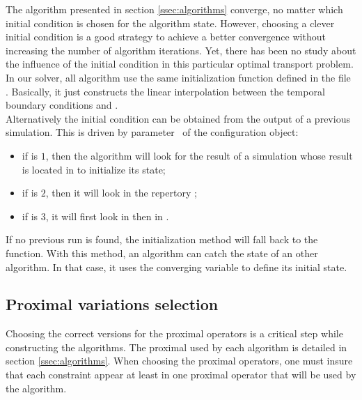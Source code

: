        The algorithm presented in section \ref{ssec:algorithms} converge, no matter which initial condition is chosen for
        the algorithm state. However, choosing a clever initial condition is a good strategy to achieve a better convergence
        without increasing the number of algorithm iterations. Yet, there has been no study about the influence of the
        initial condition in this particular optimal transport problem.\\

        In our solver, all algorithm use the same initialization function 
        defined in the file 
        . Basically, it just constructs the linear interpolation between the temporal
        boundary conditions \fI{} and \fII{}.\\

        Alternatively the initial condition can be obtained from the output of a previous simulation. This is driven by
        parameter  of the configuration object:
        \begin{itemize}
            \item if  is $1$, then the algorithm will look for the result of a simulation whose result is 
                located in  to initialize its state;
            \item if  is $2$, then it will look in the repertory ;
            \item if  is $3$, it will first look in  then in .
        \end{itemize}

        If no previous run is found, the initialization method will fall back to the  function.
        With this method, an algorithm can catch the state of an other algorithm. In that case, it uses the converging
        variable to define its initial state.

    \subsection{Proximal variations selection\label{sssec:proximal-selection}}
    \noindent

        Choosing the correct versions for the proximal operators is a critical step while constructing the algorithms. 
        The proximal used by each algorithm is detailed in section \ref{ssec:algorithms}. When choosing the proximal operators,
        one must insure that each constraint appear at least in one proximal operator that will be used by the algorithm.\\

